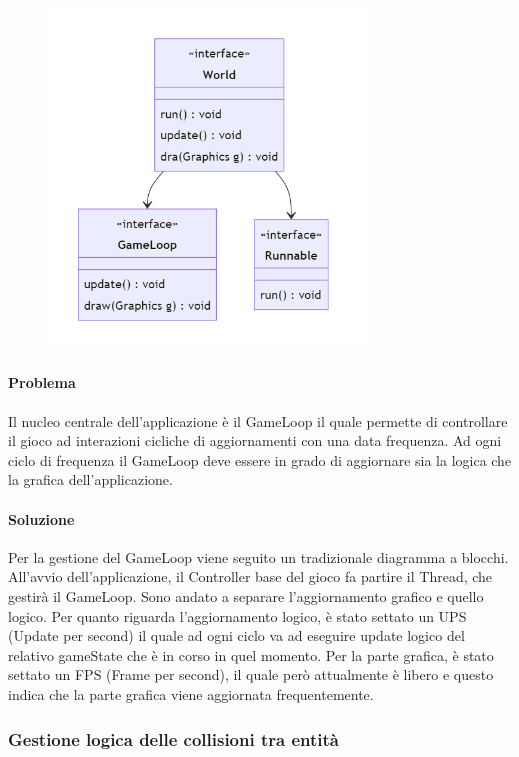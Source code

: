 \documentclass[a4paper,12pt]{report}
\begin{document}
\begin{figure}[H]
    \centering{}
    \includegraphics[width=0.75\textwidth]{img/UMLGameLoop.png}
    \caption{}
\end{figure}

\paragraph{Problema} Il nucleo centrale dell’applicazione è il GameLoop il quale permette di controllare il gioco ad interazioni cicliche di aggiornamenti con una data frequenza. Ad ogni ciclo di frequenza il GameLoop deve essere in grado di aggiornare sia la logica che la grafica dell’applicazione.

\paragraph{Soluzione} Per la gestione del GameLoop viene seguito un tradizionale diagramma a blocchi. All’avvio dell’applicazione, il Controller base del gioco fa partire il Thread, che gestirà il GameLoop. Sono andato a separare l’aggiornamento grafico e quello logico. Per quanto riguarda l'aggiornamento logico, è stato settato un UPS (Update per second) il quale ad ogni ciclo va ad eseguire update logico del relativo gameState che è in corso in quel momento. Per la parte grafica, è stato settato un FPS (Frame per second), il quale però attualmente è libero e questo indica che la parte grafica viene aggiornata frequentemente.

\subsubsection{Gestione logica delle collisioni tra entità}
\end{document}
